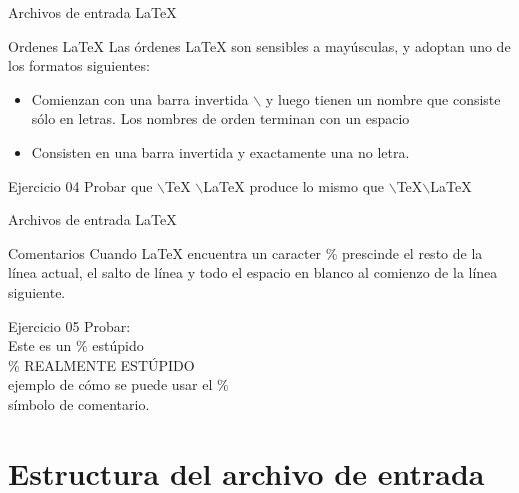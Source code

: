 \begin{frame}{Archivos de entrada \LaTeX{}}
    \begin{block}{Ordenes \LaTeX{}}
        Las \'ordenes \LaTeX{} son sensibles a may\'usculas, y adoptan uno de los formatos siguientes:
        \begin{itemize}
            \item Comienzan con una barra invertida $\backslash$ y luego tienen un nombre que consiste sólo en letras. 
                Los nombres de orden terminan con un espacio
            \item Consisten en una barra invertida y exactamente una no letra.
        \end{itemize}	
    \end{block}

    \begin{exampleblock}{Ejercicio 04}
        Probar que $\backslash$TeX $\backslash$LaTeX produce lo mismo que $\backslash$TeX$\backslash$LaTeX
    \end{exampleblock}	
\end{frame}

\begin{frame}{Archivos de entrada \LaTeX{}}
    \begin{block}{Comentarios}
        Cuando \LaTeX{} encuentra un caracter \% prescinde el resto de la l\'inea actual, 
        el salto de l\'inea y todo el espacio en blanco al comienzo de la l\'inea siguiente.
    \end{block}
    \begin{exampleblock}{Ejercicio 05}
        Probar:\\
        Este es un \% est\'upido \\
        \% REALMENTE ESTÚPIDO \\
        \hspace{2cm} ejemplo de c\'omo se puede usar el \% \\
        \hspace{1cm} s\'imbolo de comentario.
    \end{exampleblock}
\end{frame}

\section{Estructura del archivo de entrada}

